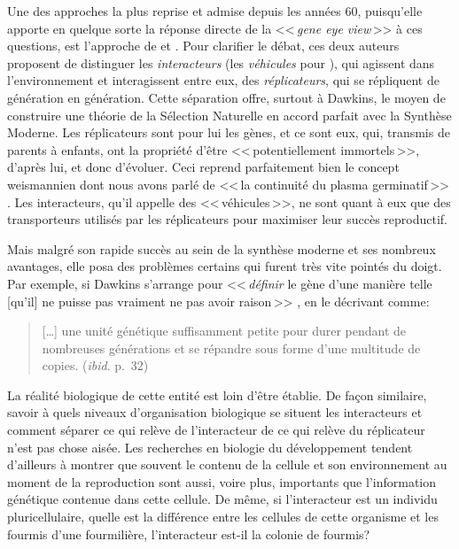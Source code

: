 Une des approches la plus reprise et admise depuis les années 60, puisqu'elle apporte en quelque sorte la réponse directe de la <<\,\emph{gene eye view}\,>> à ces questions, est l'approche de \cite{dawkins76selfishgene} et \cite{hull1974philosophyofbiologicalscience}. Pour clarifier le débat, ces deux auteurs proposent de distinguer les \emph{interacteurs} (les \emph{véhicules} pour \cite{dawkins76selfishgene}), qui agissent dans l'environnement et interagissent entre eux, des \emph{réplicateurs}, qui se répliquent de génération en génération. Cette séparation offre, surtout à Dawkins, le moyen de construire une théorie de la Sélection Naturelle en accord parfait avec la Synthèse Moderne. Les réplicateurs sont pour lui les gènes, et ce sont eux, qui, transmis de parents à enfants, ont la propriété d'être <<\,potentiellement immortels\,>>, d'après lui, et donc d'évoluer. Ceci reprend parfaitement bien le concept weismannien dont nous avons parlé de <<\,la continuité du plasma germinatif\,>> \citep[p.~11]{dawkins76selfishgene}. Les interacteurs, qu'il appelle des <<\,véhicules\,>>, ne sont quant à eux que des transporteurs utilisés par les réplicateurs pour maximiser leur succès reproductif.

Mais malgré son rapide succès au sein de la synthèse moderne et ses nombreux avantages, elle posa des problèmes certains qui furent très vite pointés du doigt. Par exemple, si Dawkins s'arrange pour <<\,\emph{définir} le gène d'une manière telle [qu'il] ne puisse pas vraiment ne pas avoir raison\,>> \citet[p.~33, emphase d'origine]{dawkins76selfishgene}, en le décrivant comme:
\begin{quote}
	[\ldots] une unité génétique suffisamment petite pour durer pendant de nombreuses générations et se répandre sous forme d'une multitude de copies.
	(\emph{ibid}. p.~32)
\end{quote}
La réalité biologique de cette entité est loin d'être établie. De façon similaire, savoir à quels niveaux d'organisation biologique se situent les interacteurs et comment séparer ce qui relève de l'interacteur de ce qui relève du réplicateur n'est pas chose aisée. Les recherches en biologie du développement tendent d'ailleurs à montrer que souvent le contenu de la cellule et son environnement au moment de la reproduction sont aussi, voire plus, importants que l'information génétique contenue dans cette cellule. De même, si l'interacteur est un individu pluricellulaire, quelle est la différence entre les cellules de cette organisme et les fourmis d'une fourmilière, l'interacteur est-il la colonie de fourmis? 

